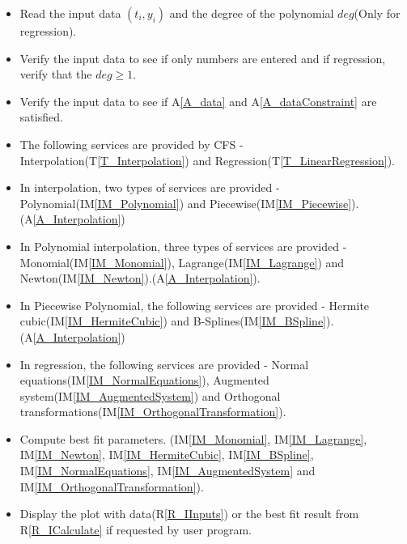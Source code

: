 \documentclass[12pt]{article}
\newcommand{\tref}[1]{T\ref{#1}}
\newcommand{\aref}[1]{A\ref{#1}}
\newcommand{\iref}[1]{IM\ref{#1}}
\newcounter{reqnum} %
\newcommand{\rref}[1]{R\ref{#1}}
\newcommand{\famname}{CFS} %
\begin{document}
\begin{itemize}
\item[R\refstepcounter{reqnum}\thereqnum \label{R_IInputs}:] Read the input 
data $(t_i,y_i)$ and the degree of the polynomial $deg$(Only for regression).

\item[R\refstepcounter{reqnum}\thereqnum \label{R_IverifyIPType}:]Verify the 
input data to see if only numbers are entered and if regression, verify that 
the $deg \geq 1$.

\item[R\refstepcounter{reqnum}\thereqnum \label{R_IverifyIPData}:]Verify the input data to see if \aref{A_data} and \aref{A_dataConstraint} are satisfied.

\item[R\refstepcounter{reqnum}\thereqnum \label{R_Int_or_Reg}:]The following 
services are provided by \famname{} - Interpolation(\tref{T_Interpolation}) and 
Regression(\tref{T_LinearRegression}).

\item[R\refstepcounter{reqnum}\thereqnum \label{R_Imethod}:]In interpolation, 
two types of services are provided - Polynomial(\iref{IM_Polynomial}) and  
Piecewise(\iref{IM_Piecewise}). (\aref{A_Interpolation})

\item[R\refstepcounter{reqnum}\thereqnum \label{R_Polynomialmethod}:]In 
Polynomial interpolation, three types of services are provided - 
Monomial(\iref{IM_Monomial}), Lagrange(\iref{IM_Lagrange}) and 
Newton(\iref{IM_Newton}).(\aref{A_Interpolation}).

\item[R\refstepcounter{reqnum}\thereqnum \label{R_Piecewisemethod}:]In 
Piecewise Polynomial, the following services are provided -  Hermite 
cubic(\iref{IM_HermiteCubic}) and B-Splines(\iref{IM_BSpline}). 
(\aref{A_Interpolation})

\item[R\refstepcounter{reqnum}\thereqnum \label{R_Rmethod}:]In regression, the 
following services are provided -   Normal 
equations(\iref{IM_NormalEquations}), Augmented 
system(\iref{IM_AugmentedSystem}) and Orthogonal 
transformations(\iref{IM_OrthogonalTransformation}).

\item[R\refstepcounter{reqnum}\thereqnum \label{R_ICalculate}:] Compute best fit
  parameters. (\iref{IM_Monomial}, \iref{IM_Lagrange}, \iref{IM_Newton}, 
  \iref{IM_HermiteCubic}, \iref{IM_BSpline},
  \iref{IM_NormalEquations}, \iref{IM_AugmentedSystem} and 
  \iref{IM_OrthogonalTransformation}).

\item[R\refstepcounter{reqnum}\thereqnum \label{R_IOutput}:] Display the plot
  with data(\rref{R_IInputs}) or the best fit result from
  \rref{R_ICalculate} if requested by user program. 

\end{itemize}
\end{document}
